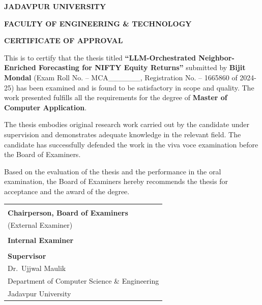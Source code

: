 \documentclass[12pt,a4paper,titlepage]{article}
\begin{document}
\begin{titlepage}
    \centering
    
    {\Large\bfseries JADAVPUR UNIVERSITY\par}
    \vspace{0.2cm}
    {\large\bfseries FACULTY OF ENGINEERING \& TECHNOLOGY\par}
    
    \vspace{2cm}
    
    {\Large\bfseries CERTIFICATE OF APPROVAL\par}
    
    \vspace{1cm}
    
    \begin{minipage}{0.9\textwidth}
        \setlength{\parindent}{1em}
        \setlength{\parskip}{0.5em}
        \normalsize
        
        This is to certify that the thesis titled \textbf{``LLM-Orchestrated Neighbor-Enriched Forecasting for NIFTY Equity Returns''} submitted by \textbf{Bijit Mondal} (Exam Roll No. -- MCA\_\_\_\_\_\_, Registration No. -- 1665860 of 2024-25) has been examined and is found to be satisfactory in scope and quality. The work presented fulfills all the requirements for the degree of \textbf{Master of Computer Application}.
        
        \vspace{0.2cm}
        
        The thesis embodies original research work carried out by the candidate under supervision and demonstrates adequate knowledge in the relevant field. The candidate has successfully defended the work in the viva voce examination before the Board of Examiners.
        
        \vspace{0.2cm}
        
        Based on the evaluation of the thesis and the performance in the oral examination, the Board of Examiners hereby recommends the thesis for acceptance and the award of the degree.
    \end{minipage}
    
    \vspace{1.5cm}
    
    \begin{tabular}{p{}}
        \hline \\[-0.6em]
        \textbf{Chairperson, Board of Examiners} \\
        (External Examiner) \\[1cm]
        \hline \\[-0.6em]
        \textbf{Internal Examiner} \\[1cm]
        \hline \\[-0.6em]
        \textbf{Supervisor} \\
        Dr.\ Ujjwal Maulik \\
        Department of Computer Science \& Engineering \\
        Jadavpur University \\
    \end{tabular}
    

\end{titlepage}
\end{document}
